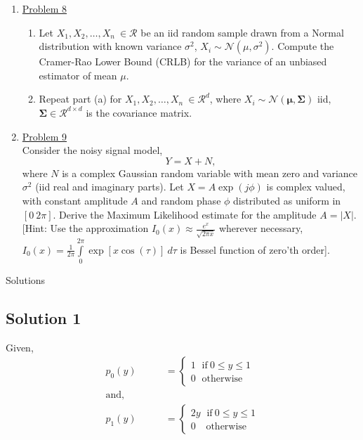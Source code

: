 \documentclass[a4paper,english,12pt]{article}
\begin{document}
\begin{enumerate}
\item \hyperlink{solution8}{Problem 8}\\
\begin{enumerate}
\item Let $X_1,X_2,\dots,X_n~\in\mathcal{R}$ be an iid random sample drawn from a Normal distribution with known variance $\sigma^2$, $X_i\sim \mathcal{N}(\mu,\sigma^2)$. Compute the Cramer-Rao Lower Bound (CRLB) for the variance of an unbiased estimator of mean $\mu$.
\item Repeat part (a) for $X_1,X_2,\dots,X_n~\in\mathcal{R}^d$, where $X_i\sim \mathcal{N}(\boldsymbol{\mu},\boldsymbol{\Sigma})$ iid, $\boldsymbol{\Sigma}\in \mathcal{R}^{d\times d}$ is the covariance matrix.
\end{enumerate}
\item \hyperlink{solution9}{Problem 9}\\
Consider the noisy signal model,
\begin{equation}
Y=X+N,
\end{equation}
where $N$ is a complex Gaussian random variable with mean zero and variance $\sigma^2$ (iid real and imaginary parts). Let $X=A\exp(j\phi)$ is complex valued, with constant amplitude $A$ and random phase $\phi$ distributed as uniform in $[0~2\pi]$. Derive the Maximum Likelihood estimate for the amplitude $A=|X|$. [Hint: Use the approximation $I_0(x)\approx \frac{e^x}{\sqrt{2\pi x}}$ wherever necessary, $I_0(x)=\frac{1}{2\pi} \int\limits_{0}^{2\pi} \exp[x\cos(\tau)]~d\tau$ is Bessel function of zero'th order].
\end{enumerate}
\newpage
\par{\centering\Large {Solutions}\par}
\hypertarget{solution1}{\subsection*{Solution 1}}
Given,
\begin{align*}
p_0(y)&=\begin{cases}
1~\hspace{5pt}\mbox{if}~0\leq y \leq 1\\
0~\hspace{5pt}\mbox{otherwise}
\end{cases}\\
\mbox{and},\hspace{40pt}&\\
p_1(y)&=\begin{cases}
2y~\hspace{5pt}\mbox{if}~0\leq y \leq 1\\
0~\hspace{10pt}\mbox{otherwise}
\end{cases}
\end{align*}
\end{document}
